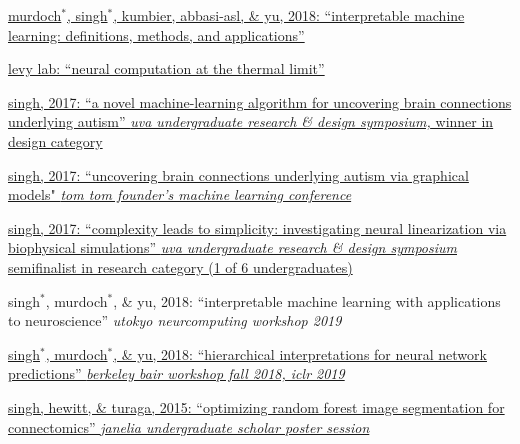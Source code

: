 \begin{minipage}[t]{0.675\textwidth}
\begin{tightitemize}
\item \href{https://arxiv.org/abs/1901.04592}{murdoch$^*$, singh$^*$, kumbier, abbasi-asl, \& yu, 2018: ``interpretable machine learning: definitions, methods, and applications'' \faChain}
\item \href{https://arxiv.org/pdf/1408.6777.pdf}{levy lab: ``neural computation at the thermal limit'' \faChain} \href{https://senselab.med.yale.edu/modeldb/ShowModel.cshtml?model=237594}{\faCode}
\end{tightitemize}

\begin{tightitemize}
\item \href{https://docs.google.com/presentation/d/1GO6lN5o2idozOUdnObXGnXKFbZiJiKKKkmx73uE4BAI/pub?start=false&loop=false&delayms=600000&slide=id.p4}{singh, 2017: ``a novel machine-learning algorithm for uncovering brain connections underlying autism'' \textit{uva undergraduate research \& design symposium,} winner in design category \faChain}
\item \href{https://docs.google.com/presentation/d/1KghayB2g8u5xwVuILzT4XtalKi3rerVROaoRb6RUVBk/edit}{singh, 2017: ``uncovering brain connections underlying autism via graphical models" \textit{tom tom founder's machine learning conference} \faChain} 
\item \href{https://docs.google.com/presentation/d/1JriXXofysuXyfU4CeyNHJUTYSfa18R9Q3EhkCwFwh4g/pub?start=false&loop=false&delayms=600000&slide=id.p}{singh, 2017: ``complexity leads to simplicity: investigating neural linearization via biophysical simulations'' \textit{uva undergraduate research \& design symposium} semifinalist in research category (1 of 6 undergraduates) \faChain}
\end{tightitemize}

\begin{tightitemize}
\item singh$^*$, murdoch$^*$, \& yu, 2018: ``interpretable machine learning with applications to neuroscience'' \textit{utokyo neurcomputing workshop 2019}
\item \href{https://arxiv.org/abs/1806.05337}{singh$^*$, murdoch$^*$, \& yu, 2018: ``hierarchical interpretations for neural network predictions'' \textit{berkeley bair workshop fall 2018, iclr 2019} \faChain} 
\item \href{https://csinva.github.io/assets/rf_segmentation_2015.pdf}{singh, hewitt, \& turaga, 2015: ``optimizing random forest image segmentation for connectomics” \textit{janelia undergraduate scholar poster session} \faChain}
\end{tightitemize}


\end{minipage}
